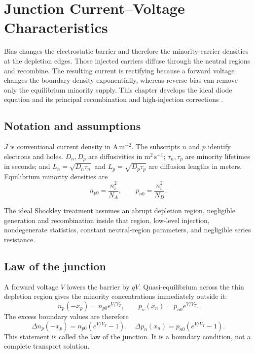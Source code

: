 \chapter{Junction Current--Voltage Characteristics}
\label{ch:junction-current-voltage}

Bias changes the electrostatic barrier and therefore the minority-carrier
densities at the depletion edges.  Those injected carriers diffuse through the
neutral regions and recombine.  The resulting current is rectifying because a
forward voltage changes the boundary density exponentially, whereas reverse
bias can remove only the equilibrium minority supply.  This chapter develops
the ideal diode equation and its principal recombination and high-injection
corrections \cite[Chap.~3, Sec.~3.4]{szeLee2012}.

\section{Notation and assumptions}

$J$ is conventional current density in $\mathrm{A\,m^{-2}}$.  The subscripts
$n$ and $p$ identify electrons and holes.  $D_n,D_p$ are diffusivities in
$\mathrm{m^2\,s^{-1}}$; $\tau_n,\tau_p$ are minority lifetimes in seconds; and
$L_n=\sqrt{D_n\tau_n}$ and $L_p=\sqrt{D_p\tau_p}$ are diffusion lengths in
meters.  Equilibrium minority densities are
\begin{equation}
 n_{p0}=\frac{n_i^2}{N_A},
 \qquad
 p_{n0}=\frac{n_i^2}{N_D}.
 \label{eq:pn-equilibrium-minority-densities}
\end{equation}

The ideal Shockley treatment assumes an abrupt depletion region, negligible
generation and recombination inside that region, low-level injection,
nondegenerate statistics, constant neutral-region parameters, and negligible
series resistance.

\section{Law of the junction}

A forward voltage $V$ lowers the barrier by $qV$.  Quasi-equilibrium across the
thin depletion region gives the minority concentrations immediately outside it:
\begin{equation}
 \boxed{
 n_p(-x_p)=n_{p0}e^{V/V_T},
 \qquad
 p_n(x_n)=p_{n0}e^{V/V_T}.
 }
 \label{eq:law-of-junction}
\end{equation}
The excess boundary values are therefore
\begin{equation}
 \Delta n_p(-x_p)=n_{p0}(e^{V/V_T}-1),
 \quad
 \Delta p_n(x_n)=p_{n0}(e^{V/V_T}-1).
 \label{eq:pn-boundary-excess}
\end{equation}
This statement is called the law of the junction.  It is a boundary condition,
not a complete transport solution.

